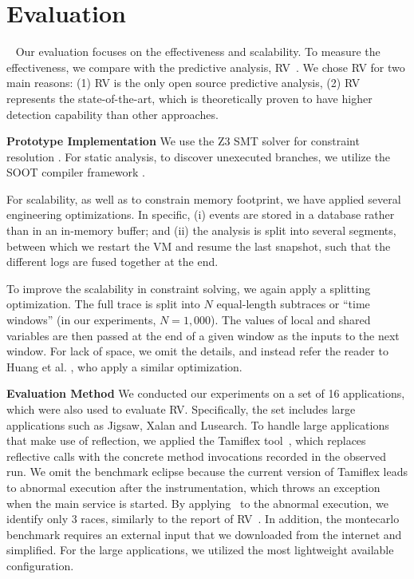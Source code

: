 \section{Evaluation}~\label{sec:eval}
Our evaluation focuses on the effectiveness  and scalability.
To measure the effectiveness, we compare with the predictive analysis, 
{\sf RV}~\cite{pldi14}. We chose RV for two main reasons: (1) {\sf RV} is the 
only open source predictive analysis, (2) {\sf RV} represents the 
state-of-the-art, which is theoretically proven to have higher detection 
capability than other approaches. 

{\bf Prototype Implementation}  We use the Z3 SMT solver for constraint 
resolution \cite{MouraB08}. For static analysis, to discover unexecuted 
branches, we utilize the SOOT compiler framework \cite{Vallee-RaiCGHLS99}.

For scalability, as well as to constrain memory footprint, we have 
applied several engineering optimizations. In specific, (i) events are 
stored in a database rather than in an in-memory buffer; and (ii) the 
analysis is split into several segments, between which we restart 
the VM and resume the last snapshot, such that the different logs 
are fused together at the end. 


To improve the scalability in constraint solving, we again apply 
a splitting optimization. The full trace is split into $N$ equal-length 
subtraces or ``time windows'' (in our experiments, $N=1,000$). The values 
of local and shared variables are then passed at the end of a 
given window as the inputs to the next window. For lack of space, we 
omit the details, and instead refer the reader to 
Huang et al. \cite{pldi14}, who apply a similar optimization.


{\bf Evaluation Method} We conducted our experiments on a set of 16 
applications, which were also used to evaluate {\sf RV}. Specifically, 
the set includes large applications such as {\sf Jigsaw}, 
{\sf Xalan} and {\sf Lusearch}. To handle large applications that make 
use of reflection, we applied the {\sf Tamiflex} tool~\cite{tamiflex}, which 
replaces reflective calls with the concrete method invocations recorded 
in the observed run.
We omit the benchmark {\sf eclipse} because the current version 
of {\sf Tamiflex}  leads to abnormal execution after the instrumentation, 
which throws an exception when the main service is started. 
By applying \tool\  to the abnormal execution, we identify only 3 races, 
similarly to the report of RV~\cite{pldi14}.
In addition, the {\sf montecarlo} benchmark requires an external input 
that we downloaded from the internet and simplified. For the large 
applications, we utilized the most lightweight available configuration.



